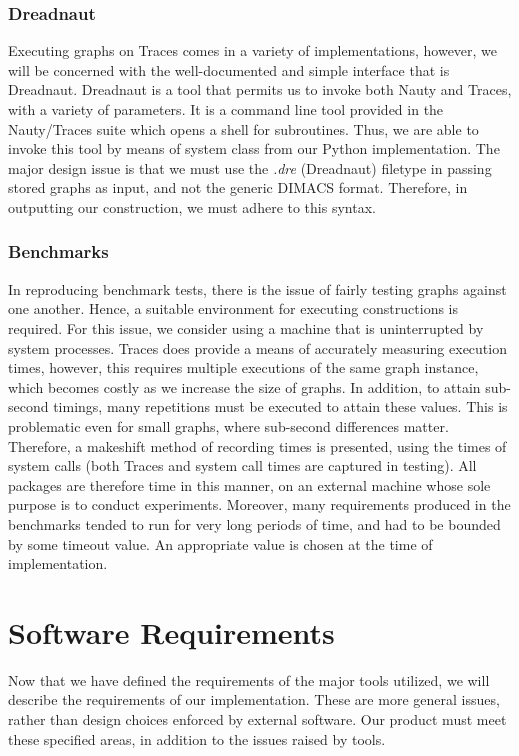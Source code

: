 \subsubsection{Dreadnaut}
Executing graphs on Traces comes in a variety of implementations, however, we will be concerned with the well-documented and simple interface that is Dreadnaut. Dreadnaut is a tool that permits us to invoke both Nauty and Traces, with a variety of parameters. It is a command line tool provided in the Nauty/Traces suite which opens a shell for subroutines. Thus, we are able to invoke this tool by means of system class from our Python implementation. The major design issue is that we must use the \emph{.dre} (Dreadnaut) filetype in passing stored graphs as input, and not the generic DIMACS format. Therefore, in outputting our construction, we must adhere to this syntax.

\subsubsection{Benchmarks}
In reproducing benchmark tests, there is the issue of fairly testing graphs against one another. Hence, a suitable environment for executing constructions is required. For this issue, we consider using a machine that is uninterrupted by system processes. Traces does provide a means of accurately measuring execution times, however, this requires multiple executions of the same graph instance, which becomes costly as we increase the size of graphs. In addition, to attain sub-second timings, many repetitions must be executed to attain these values. This is problematic even for small graphs, where sub-second differences matter. Therefore, a makeshift method of recording times is presented, using the times of system calls (both Traces and system call times are captured in testing). All packages are therefore time in this manner, on an external machine whose sole purpose is to conduct experiments. Moreover, many requirements produced in the benchmarks tended to run for very long periods of time, and had to be bounded by some timeout value. An appropriate value is chosen at the time of implementation.

\section{Software Requirements}
Now that we have defined the requirements of the major tools utilized, we will describe the requirements of our implementation. These are more general issues, rather than design choices enforced by external software. Our product must meet these specified areas, in addition to the issues raised by tools. 

